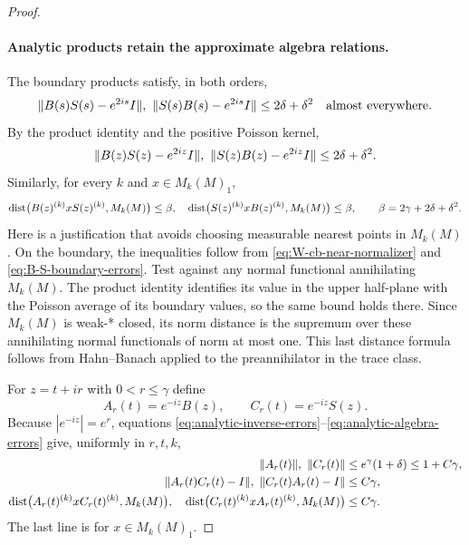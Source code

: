 \begin{proof}
\paragraph{Analytic products retain the approximate algebra relations.}
The boundary products satisfy, in both orders,
\[
 \norm{B(s)S(s)-e^{2is}I},\ 
 \norm{S(s)B(s)-e^{2is}I}\leq2\delta+\delta^2
 \quad\hbox{almost everywhere}.
\]
By the product identity and the positive Poisson kernel,
\begin{equation}\label{eq:analytic-inverse-errors}
 \norm{B(z)S(z)-e^{2iz}I},\ 
 \norm{S(z)B(z)-e^{2iz}I}\leq2\delta+\delta^2.
\end{equation}
Similarly, for every $k$ and $x\in M_k(M)_1$,
\begin{equation}\label{eq:analytic-algebra-errors}
 \operatorname{dist}\bigl(B(z)^{(k)}xS(z)^{(k)},M_k(M)\bigr)\leq\beta,
 \quad
 \operatorname{dist}\bigl(S(z)^{(k)}xB(z)^{(k)},M_k(M)\bigr)\leq\beta,
 \qquad \beta=2\gamma+2\delta+\delta^2.
\end{equation}
Here is a justification that avoids choosing measurable nearest
points in $M_k(M)$.  On the boundary, the inequalities follow from
\eqref{eq:W-cb-near-normalizer} and
\eqref{eq:B-S-boundary-errors}.  Test against any normal functional
annihilating $M_k(M)$.  The product identity identifies its value in
the upper half-plane with the Poisson average of its boundary values,
so the same bound holds there.  Since $M_k(M)$ is weak-* closed, its
norm distance is the supremum over these annihilating normal
functionals of norm at most one.  This last distance formula follows
from Hahn--Banach applied to the preannihilator in the trace class.

For $z=t+ir$ with $0<r\leq\gamma$ define
\[
 A_r(t)=e^{-iz}B(z),\qquad C_r(t)=e^{-iz}S(z).
\]
Because $|e^{-iz}|=e^r$, equations
\eqref{eq:analytic-inverse-errors}--\eqref{eq:analytic-algebra-errors}
give, uniformly in $r,t,k$,
\begin{align}
 \lVert A_r(t)\rVert,\ \lVert C_r(t)\rVert&\leq e^\gamma(1+\delta)
                                      \leq1+C\gamma,\label{eq:AC-norms}\\
 \lVert A_r(t)C_r(t)-I\rVert,\ \lVert C_r(t)A_r(t)-I\rVert
                                      &\leq C\gamma,\label{eq:AC-inverses}\\
 \operatorname{dist}\bigl(A_r(t)^{(k)}xC_r(t)^{(k)},M_k(M)\bigr),\quad
 \operatorname{dist}\bigl(C_r(t)^{(k)}xA_r(t)^{(k)},M_k(M)\bigr)
                                      &\leq C\gamma.
                                      \label{eq:AC-algebras}
\end{align}
The last line is for $x\in M_k(M)_1$.


\end{proof}
